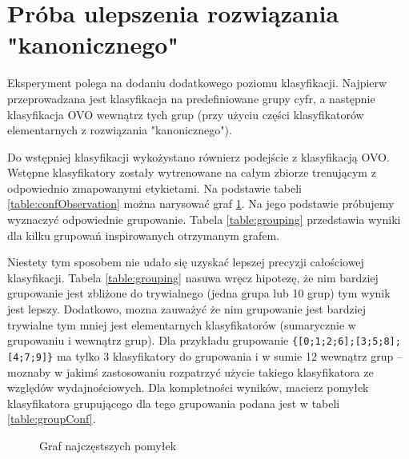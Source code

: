 \documentclass[a4paper]{article}
\begin{document}
\section{Próba ulepszenia rozwiązania "kanonicznego"}
\label{improved}

Eksperyment polega na dodaniu dodatkowego poziomu klasyfikacji.
Najpierw przeprowadzana jest klasyfikacja na predefiniowane grupy cyfr,
a następnie klasyfikacja OVO wewnątrz tych grup
(przy użyciu części klasyfikatorów elementarnych z rozwiązania "kanonicznego").

Do wstępniej klasyfikacji wykożystano równierz podejście z klasyfikacją OVO.
Wstępne klasyfikatory zostały wytrenowane na całym zbiorze trenującym
z odpowiednio zmapowanymi etykietami.
Na podstawie tabeli \ref{table:confObservation} można narysować graf \ref{fig:graph}.
Na jego podstawie próbujemy wyznaczyć odpowiednie grupowanie.
Tabela \ref{table:grouping} przedstawia wyniki dla kilku grupowań inspirowanych otrzymanym grafem.

Niestety tym sposobem nie udało się uzyskać lepszej precyzji całościowej klasyfikacji.
Tabela \ref{table:grouping} nasuwa wręcz hipotezę, że nim bardziej grupowanie jest zbliżone do trywialnego (jedna grupa lub 10 grup)
tym wynik jest lepszy. Dodatkowo, mozna zauważyć że nim grupowanie jest bardziej trywialne tym mniej jest elementarnych klasyfikatorów
(sumarycznie w grupowaniu i wewnątrz grup). Dla przykładu grupowanie \verb|{[0;1;2;6];[3;5;8];[4;7;9]}| ma tylko 3 klasyfikatory do grupowania
i w sumie 12 wewnątrz grup -- moznaby w jakimś zastosowaniu rozpatrzyć użycie takiego klasyfikatora ze względów wydajnościowych.
Dla kompletności wyników, macierz pomyłek klasyfikatora grupującego dla tego grupowania podana jest w tabeli \ref{table:groupConf}.

\begin{figure}[H]
    \caption{Graf najczęstszych pomyłek
    \label{fig:graph}
    }
\begin{center}


\end{center}
\end{figure}
\end{document}
